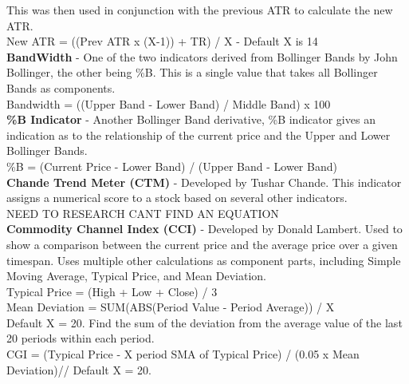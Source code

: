 \documentclass[12pt,a4paper]{article}
\begin{document}
This was then used in conjunction with the previous ATR to calculate the new ATR.\\

New ATR = ((Prev ATR x (X-1)) + TR) / X - Default X is 14 \\

\iffalse
[]
\fi

\textbf{BandWidth}  - One of the two indicators derived from Bollinger Bands by John Bollinger, the other being \%B. This is a single value that takes all Bollinger Bands as components.\\

Bandwidth = ((Upper Band - Lower Band) / Middle Band) x 100 \\

\iffalse
[]
\fi

\textbf{\%B Indicator} - Another Bollinger Band derivative, \%B indicator gives an indication as to the relationship of the current price and the Upper and Lower Bollinger Bands. \\

\%B = (Current Price - Lower Band) / (Upper Band - Lower Band)\\

\iffalse
[]
\fi

\textbf{Chande Trend Meter (CTM)} - Developed by Tushar Chande. This indicator assigns a numerical score to a stock based on several other indicators.\\

NEED TO RESEARCH CANT FIND AN EQUATION\\

\iffalse
[]
\fi

\textbf{Commodity Channel Index (CCI)} - Developed by Donald Lambert. Used to show a comparison between the current price and the average price over a given timespan. Uses multiple other calculations as component parts, including Simple Moving Average, Typical Price, and Mean Deviation.\\

Typical Price = (High + Low + Close) / 3\\

Mean Deviation = SUM(ABS(Period Value - Period Average)) / X\\
Default X = 20. Find the sum of the deviation from the average value of the last 20 periods within each period. \\

CGI = (Typical Price - X period SMA of Typical Price) / (0.05 x Mean Deviation)//
Default X = 20.\\
\end{document}
